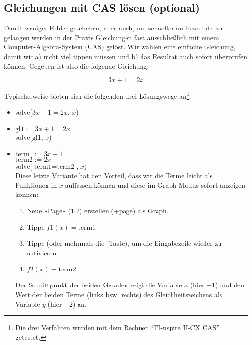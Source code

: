 
\subsection{Gleichungen mit CAS lösen (optional)}
Damit weniger Fehler geschehen, aber auch, um schneller an Resultate zu gelangen werden in der Praxis Gleichungen fast ausschließlich mit einem Computer-Algebra-System (CAS) gelöst.
Wir wählen eine einfache Gleichung, damit wir a) nicht viel tippen müssen und b) das Resultat auch sofort überprüfen können. Gegeben ist also die folgende Gleichung:

$$3x+1=2x$$

Typischerweise bieten sich die folgenden drei Lösungswege an\footnote{Die drei Verfahren wurden mit dem Rechner ``TI-nspire II-CX CAS'' getestet.}:
\begin{itemize}
\item solve($3x+1=2x$, $x$)
\item $\text{gl1} := 3x+1=2x$\\
  solve($\text{gl1}$, $x$)
  
\item $\text{term1} := 3x+1$\\
  $\text{term2} := 2x$\\
  solve($\text{term1}=\text{term2}$, $x$)\\
  Diese letzte Variante hat den Vorteil, dass wir die Terme leicht als Funktionen in $x$ auffassen können und diese im Graph-Modus sofort anzeigen können:
  \begin{enumerate}
    \item Neue «Page» (1.2) erstellen (+page) als Graph. 
    \item Tippe $f1(x)=\text{term1}$
    \item Tippe   (oder mehrmals die -Taste), um die Eingabezeile wieder zu aktivieren.
      \item $f2(x)=\text{term2}$
  \end{enumerate}

  Der Schnittpunkt der beiden Geraden zeigt die Variable $x$ (hier $-1$) und den Wert der beiden Terme (links bzw. rechts) des Gleichheitszeichens als Variable $y$ (hier $-2$) an.

\end{itemize}

\newpage
